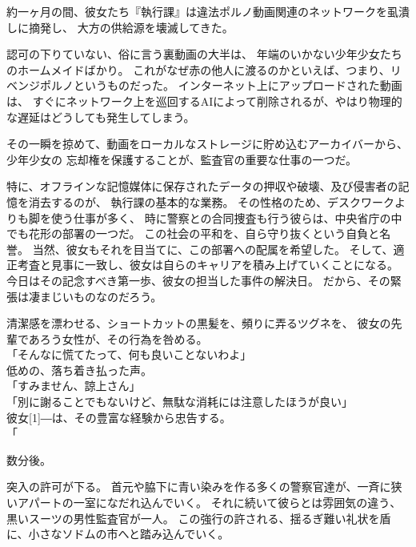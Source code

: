 \documentclass[../NenokuniMain]{subfiles}
\begin{document}
約一ヶ月の間、彼女たち『執行課』は違法ポルノ動画関連のネットワークを虱潰しに摘発し、
大方の供給源を壊滅してきた。

認可の下りていない、俗に言う裏動画の大半は、
年端のいかない少年少女たちのホームメイドばかり。
これがなぜ赤の他人に渡るのかといえば、つまり、リベンジポルノというものだった。
インターネット上にアップロードされた動画は、
すぐにネットワーク上を巡回するAIによって削除されるが、やはり物理的な遅延はどうしても発生してしまう。

その一瞬を掠めて、動画をローカルなストレージに貯め込むアーカイバーから、少年少女の
忘却権を保護することが、監査官の重要な仕事の一つだ。

特に、オフラインな記憶媒体に保存されたデータの押収や破壊、及び侵害者の記憶を消去するのが、
執行課の基本的な業務。
その性格のため、デスクワークよりも脚を使う仕事が多く、
時に警察との合同捜査も行う彼らは、中央省庁の中でも花形の部署の一つだ。
この社会の平和を、自ら守り抜くという自負と名誉。
当然、彼女もそれを目当てに、この部署への配属を希望した。
そして、適正考査と見事に一致し、彼女は自らのキャリアを積み上げていくことになる。
今日はその記念すべき第一歩、彼女の担当した事件の解決日。
だから、その緊張は凄まじいものなのだろう。

清潔感を漂わせる、ショートカットの黒髪を、頻りに弄るツグネを、
彼女の先輩であろう女性が、その行為を咎める。\\
「そんなに慌てたって、何も良いことないわよ」\\
低めの、落ち着き払った声。\\
「すみません、諒上さん」\\
「別に謝ることでもないけど、無駄な消耗には注意したほうが良い」\\
彼女\scalebox{2}[1]{―}は、その豊富な経験から忠告する。\\
「

数分後。

突入の許可が下る。
首元や脇下に青い染みを作る多くの警察官達が、一斉に狭いアパートの一室になだれ込んでいく。
それに続いて彼らとは雰囲気の違う、黒いスーツの男性監査官が一人。
この強行の許される、揺るぎ難い礼状を盾に、小さなソドムの市へと踏み込んでいく。
\end{document}
